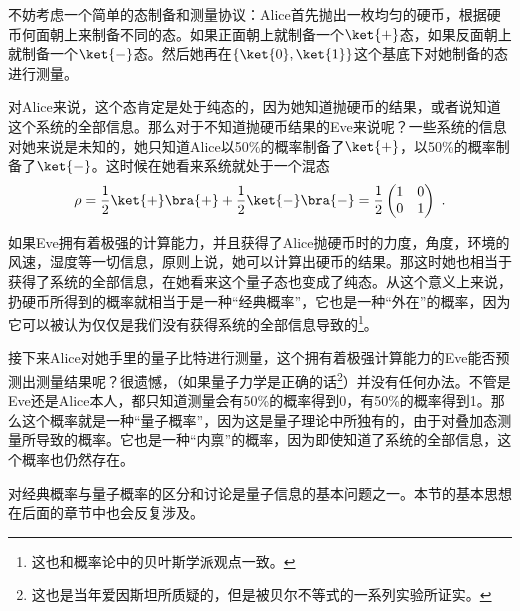 不妨考虑一个简单的态制备和测量协议：Alice首先抛出一枚均匀的硬币，根据硬币何面朝上来制备不同的态。如果正面朝上就制备一个$\ket{+}$态，如果反面朝上就制备一个$\ket{-}$态。然后她再在$\{\ket{0},\ket{1}\}$这个基底下对她制备的态进行测量。

对Alice来说，这个态肯定是处于纯态的，因为她知道抛硬币的结果，或者说知道这个系统的全部信息。那么对于不知道抛硬币结果的Eve来说呢？一些系统的信息对她来说是未知的，她只知道Alice以50\%的概率制备了$\ket{+}$，以50\%的概率制备了$\ket{-}$。这时候在她看来系统就处于一个混态
\begin{equation}
\rho=\frac{1}{2}\ket{+}\bra{+}+\frac{1}{2}\ket{-}\bra{-}=\frac{1}{2}\begin{pmatrix}
1 & 0\\
0 & 1
\end{pmatrix}~.
\end{equation}

如果Eve拥有着极强的计算能力，并且获得了Alice抛硬币时的力度，角度，环境的风速，湿度等一切信息，原则上说，她可以计算出硬币的结果。那这时她也相当于获得了系统的全部信息，在她看来这个量子态也变成了纯态。从这个意义上来说，扔硬币所得到的概率就相当于是一种“经典概率”，它也是一种“外在”的概率，因为它可以被认为仅仅是我们没有获得系统的全部信息导致的\footnote{这也和概率论中的贝叶斯学派观点一致。}。

接下来Alice对她手里的量子比特进行测量，这个拥有着极强计算能力的Eve能否预测出测量结果呢？很遗憾，（如果量子力学是正确的话\footnote{这也是当年爱因斯坦所质疑的，但是被贝尔不等式的一系列实验所证实。}）并没有任何办法。不管是Eve还是Alice本人，都只知道测量会有50\%的概率得到0，有50\%的概率得到1。那么这个概率就是一种“量子概率”，因为这是量子理论中所独有的，由于对叠加态测量所导致的概率。它也是一种“内禀”的概率，因为即使知道了系统的全部信息，这个概率也仍然存在。

对经典概率与量子概率的区分和讨论是量子信息的基本问题之一。本节的基本思想在后面的章节中也会反复涉及。








